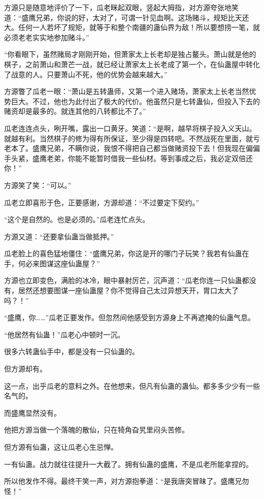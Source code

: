 \begin{this_body}
方源只是随意地评价了一下，瓜老眯起双眼，竖起大拇指，对方源夸张地笑道：“盛鹰兄弟，你说的好，太对了，可谓一针见血啊。这场赌斗，规矩比天还大。任何一人若坏了规矩，就等于和整个南疆的蛊仙界为敌！所以要想捞一笔，就必须老老实实地参加赌斗。”

“你看眼下，虽然赌局才刚刚开始，但萧家太上长老却是独占鳌头。萧山就是他的棋子，之前萧山和萧芒一战，就已经让萧家太上长老成了第一个，在仙蛊屋中转化了战意的人。只要萧山不死，他的优势会越来越大。”

方源瞥了瓜老一眼：“萧山是五转蛊师，又第一个进入赌场，萧家太上长老当然优势巨大。不过，他也为此付出了极大的代价。他虽然只是七转蛊仙，但投入下去的赌资却是最多的。就连其他的八转都比不了。”

瓜老连连点头，咧开嘴，露出一口黄牙。笑道：“是啊，越早将棋子投入义天山。就越有利。当然棋子的修为得有所保证，至少得是四转吧。不然战死在里面，就亏老本了。盛鹰兄弟，不瞒你说，我恨不得把自己都当做赌资投下去！但我现在偏偏手头紧，盛鹰老弟，你能不能暂时借我一些仙材。等到事成之后，我必定双倍还你！”

方源笑了笑：“可以。”

瓜老立即喜形于色，正要感谢，方源却道：“不过要定下契约。”

“这个是自然的。也是必须的。”瓜老连忙点头。

方源又道：“还要拿仙蛊当做抵押。”

瓜老脸上的喜色猛地僵住：“盛鹰兄弟，你这是开的哪门子玩笑？我若有仙蛊在手，何必来图谋这座仙蛊屋？”

方源也立即变色，满脸的冰冷，眼中暴射厉芒，沉声道：“瓜老你连一只仙蛊都没有，居然还想要图谋一座仙蛊屋？你不觉得自己太过异想天开，胃口太大了吗？！”

“盛鹰，你……”瓜老正要发作。但忽然间他感受到方源身上不再遮掩的仙蛊气息。

“他居然有仙蛊！”瓜老心中顿时一沉。

很多六转蛊仙手中，都是没有一只仙蛊的。

但方源却有。

这一点，出乎瓜老的意料之外。在他想来，但凡有仙蛊的蛊仙。都多多少少有一些名气的。

而盛鹰显然没有。

他把方源当做一个落魄的散仙，只在犄角旮旯里闷头苦修。

但方源有仙蛊，这让瓜老心生忌惮。

一有仙蛊。战力就往往提升一大截了。拥有仙蛊的盛鹰，不是瓜老所能拿捏的。

所以他发作不得。最终干笑一声，对方源抱拳道：“是我唐突冒昧了。盛鹰兄勿怪！”


\end{this_body}
